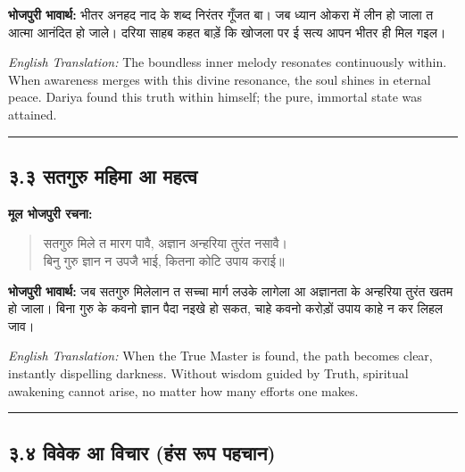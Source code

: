 \textbf{भोजपुरी भावार्थ:} भीतर अनहद नाद के शब्द निरंतर गूँजत बा। जब ध्यान ओकरा में लीन हो जाला त आत्मा आनंदित हो जाले। दरिया साहब कहत बाड़ें कि खोजला पर ई सत्य आपन भीतर ही मिल गइल।

\begin{sloppypar}
{\engfont \textit{English Translation:} The boundless inner melody resonates continuously within.
When awareness merges with this divine resonance, the soul shines in eternal peace.
Dariya found this truth within himself; the pure, immortal state was attained.}
\end{sloppypar}

\begin{center}
{\color{bordercolor}\rule{0.4\textwidth}{0.4pt}}
\end{center}

\subsection*{३.३ सतगुरु महिमा आ महत्व}

\textbf{मूल भोजपुरी रचना:}

\begin{quote}
सतगुरु मिले त मारग पावै, अज्ञान अन्हरिया तुरंत नसावै।\\
बिनु गुरु ज्ञान न उपजै भाई, कितना कोटि उपाय कराई॥
\end{quote}

\textbf{भोजपुरी भावार्थ:} जब सतगुरु मिलेलान त सच्चा मार्ग लउके लागेला आ अज्ञानता के अन्हरिया तुरंत खतम हो जाला। बिना गुरु के कवनो ज्ञान पैदा नइखे हो सकत, चाहे कवनो करोड़ों उपाय काहे न कर लिहल जाव।

\begin{sloppypar}
{\engfont \textit{English Translation:} When the True Master is found, the path becomes clear, instantly dispelling darkness.
Without wisdom guided by Truth, spiritual awakening cannot arise, no matter how many efforts one makes.}
\end{sloppypar}

\begin{center}
{\color{bordercolor}\rule{0.4\textwidth}{0.4pt}}
\end{center}

\subsection*{३.४ विवेक आ विचार (हंस रूप पहचान)}


